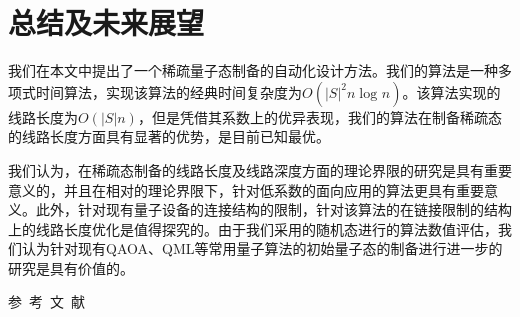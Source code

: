 \documentclass[10.5pt,compsoc,UTF8]{CjC}
\newcommand{\heiti}{\CJKfamily{STHeiti}}
\theoremstyle{mystyle}
\begin{document}


\section{\heiti 总结及未来展望}

我们在本文中提出了一个稀疏量子态制备的自动化设计方法。我们的算法是一种多项式时间算法，实现该算法的经典时间复杂度为$O\left ( \left |  S\right |^2 n \log_{}{n}  \right ) $。该算法实现的线路长度为$O\left ( \left |  S\right | n \right ) $，但是凭借其系数上的优异表现，我们的算法在制备稀疏态的线路长度方面具有显著的优势，是目前已知最优。

我们认为，在稀疏态制备的线路长度及线路深度方面的理论界限的研究是具有重要意义的，并且在相对的理论界限下，针对低系数的面向应用的算法更具有重要意义。此外，针对现有量子设备的连接结构的限制，针对该算法的在链接限制的结构上的线路长度优化是值得探究的。由于我们采用的随机态进行的算法数值评估，我们认为针对现有QAOA、QML等常用量子算法的初始量子态的制备进行进一步的研究是具有价值的。



\newpage

\vspace {10mm}
\centerline
{\textsf{参~考~文~献}}
 \addtolength{\itemsep}{-1em}
\vspace {1.5mm}









\end{document}

